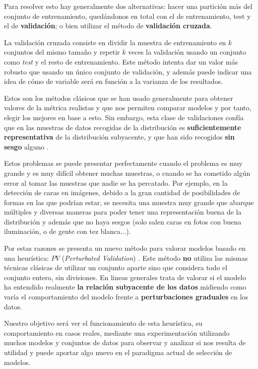 Para resolver esto hay generalmente dos alternativas: hacer una partición más del conjunto de entrenamiento, quedándonos en total con el de entrenamiento, test y el de \textbf{validación}; o bien utilizar el método de \textbf{validación cruzada}.

La validación cruzada consiste en dividir la muestra de entrenamiento en $k$ conjuntos del mismo tamaño y repetir $k$ veces la validación usando un conjunto como \emph{test} y el resto de entrenamiento. Este método intenta dar un valor más robusto que usando un único conjunto de validación, y además puede indicar una idea de cómo de variable será en función a la varianza de los resultados.

Estos son los métodos clásicos que se han usado generalmente para obtener valores de la métrica realistas y que nos permiten comparar modelos y por tanto, elegir los mejores en base a esto. Sin embargo, esta clase de validaciones confía que en las muestras de datos recogidas de la distribución es \textbf{suficientemente representativa} de la distribución subyacente, y que han sido recogidos \textbf{sin sesgo} alguno \cite{zhang2019perturbation}.

Estos problemas se puede presentar perfectamente cuando el problema es muy grande y es muy difícil obtener muchas muestras, o cuando se ha cometido algún error al tomar las muestras que nadie se ha percatado. Por ejemplo, en la detección de caras en imágenes, debido a la gran cantidad de posibilidades de formas en las que podrían estar, se necesita una muestra muy grande que abarque múltiples y diversas maneras para poder tener una representación buena de la distribución y además que no haya sesgos (solo salen caras en fotos con buena iluminación, o de gente con tez blanca...).

Por estas razones se presenta un nuevo método para valorar modelos basado en una heurística: $PV$ (\emph{Perturbated Validation}) \cite{zhang2019perturbation}. Este método \textbf{no} utiliza las mismas técnicas clásicas de utilizar un conjunto aparte sino que considera todo el conjunto entero, sin divisiones. En lineas generales trata de valorar si el modelo ha entendido realmente \textbf{la relación subyacente de los datos} midiendo como varía el comportamiento del modelo frente a \textbf{perturbaciones graduales} en los datos.

Nuestro objetivo será ver el funcionamiento de esta heurística, su comportamiento en casos reales, mediante una experimentación utilizando muchos modelos y conjuntos de datos para observar y analizar si nos resulta de utilidad y puede aportar algo nuevo en el paradigma actual de selección de modelos.

